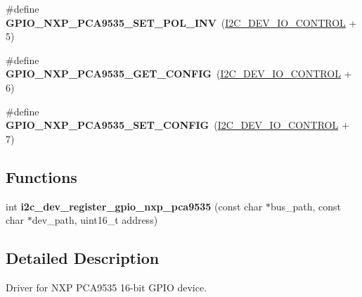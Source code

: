 \begin{DoxyCompactItemize}
\#define {\bfseries G\+P\+I\+O\+\_\+\+N\+X\+P\+\_\+\+P\+C\+A9535\+\_\+\+S\+E\+T\+\_\+\+P\+O\+L\+\_\+\+I\+NV}~(\mbox{\hyperlink{group__I2CDevice_gae8b74d1b5fc16a9c31e4da115b0ab004}{I2\+C\+\_\+\+D\+E\+V\+\_\+\+I\+O\+\_\+\+C\+O\+N\+T\+R\+OL}} + 5)
\item 
\mbox{\label{group__I2CGPIONXPPCA9535_ga784cba6f0862de2310113e549b41b111}} 
\#define {\bfseries G\+P\+I\+O\+\_\+\+N\+X\+P\+\_\+\+P\+C\+A9535\+\_\+\+G\+E\+T\+\_\+\+C\+O\+N\+F\+IG}~(\mbox{\hyperlink{group__I2CDevice_gae8b74d1b5fc16a9c31e4da115b0ab004}{I2\+C\+\_\+\+D\+E\+V\+\_\+\+I\+O\+\_\+\+C\+O\+N\+T\+R\+OL}} + 6)
\item 
\mbox{\label{group__I2CGPIONXPPCA9535_gaed4f7192582dbd129a578766b3f77de6}} 
\#define {\bfseries G\+P\+I\+O\+\_\+\+N\+X\+P\+\_\+\+P\+C\+A9535\+\_\+\+S\+E\+T\+\_\+\+C\+O\+N\+F\+IG}~(\mbox{\hyperlink{group__I2CDevice_gae8b74d1b5fc16a9c31e4da115b0ab004}{I2\+C\+\_\+\+D\+E\+V\+\_\+\+I\+O\+\_\+\+C\+O\+N\+T\+R\+OL}} + 7)
\end{DoxyCompactItemize}
\subsection*{Functions}
\begin{DoxyCompactItemize}
\item 
\mbox{\label{group__I2CGPIONXPPCA9535_gace67a1e02f03afdf690e2967721877f3}} 
int {\bfseries i2c\+\_\+dev\+\_\+register\+\_\+gpio\+\_\+nxp\+\_\+pca9535} (const char $\ast$bus\+\_\+path, const char $\ast$dev\+\_\+path, uint16\+\_\+t address)
\end{DoxyCompactItemize}


\subsection{Detailed Description}
Driver for N\+XP P\+C\+A9535 16-\/bit G\+P\+IO device. 

